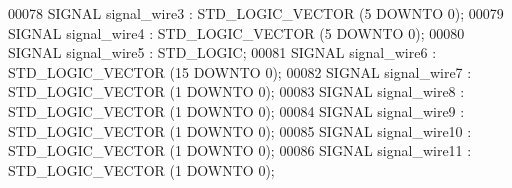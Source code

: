 \begin{DoxyCode}
{00078     \textcolor{keywordflow}{SIGNAL} \textcolor{vhdlchar}{signal_wire3} \textcolor{vhdlchar}{:}  \textcolor{comment}{STD\_LOGIC\_VECTOR} \textcolor{vhdlchar}{(}\textcolor{vhdllogic}{}\textcolor{vhdllogic}{5} \textcolor{keywordflow}{DOWNTO} \textcolor{vhdllogic}{}\textcolor{vhdllogic}{0}\textcolor{vhdlchar}{)};
00079     \textcolor{keywordflow}{SIGNAL} \textcolor{vhdlchar}{signal_wire4} \textcolor{vhdlchar}{:}  \textcolor{comment}{STD\_LOGIC\_VECTOR} \textcolor{vhdlchar}{(}\textcolor{vhdllogic}{}\textcolor{vhdllogic}{5} \textcolor{keywordflow}{DOWNTO} \textcolor{vhdllogic}{}\textcolor{vhdllogic}{0}\textcolor{vhdlchar}{)};
00080     \textcolor{keywordflow}{SIGNAL} \textcolor{vhdlchar}{signal_wire5} \textcolor{vhdlchar}{:}  \textcolor{comment}{STD\_LOGIC};
00081     \textcolor{keywordflow}{SIGNAL} \textcolor{vhdlchar}{signal_wire6} \textcolor{vhdlchar}{:}  \textcolor{comment}{STD\_LOGIC\_VECTOR} \textcolor{vhdlchar}{(}\textcolor{vhdllogic}{}\textcolor{vhdllogic}{15} \textcolor{keywordflow}{DOWNTO} \textcolor{vhdllogic}{}\textcolor{vhdllogic}{0}\textcolor{vhdlchar}{)};
00082     \textcolor{keywordflow}{SIGNAL} \textcolor{vhdlchar}{signal_wire7} \textcolor{vhdlchar}{:}  \textcolor{comment}{STD\_LOGIC\_VECTOR} \textcolor{vhdlchar}{(}\textcolor{vhdllogic}{}\textcolor{vhdllogic}{1} \textcolor{keywordflow}{DOWNTO} \textcolor{vhdllogic}{}\textcolor{vhdllogic}{0}\textcolor{vhdlchar}{)};
00083     \textcolor{keywordflow}{SIGNAL} \textcolor{vhdlchar}{signal_wire8} \textcolor{vhdlchar}{:}  \textcolor{comment}{STD\_LOGIC\_VECTOR} \textcolor{vhdlchar}{(}\textcolor{vhdllogic}{}\textcolor{vhdllogic}{1} \textcolor{keywordflow}{DOWNTO} \textcolor{vhdllogic}{}\textcolor{vhdllogic}{0}\textcolor{vhdlchar}{)};
00084     \textcolor{keywordflow}{SIGNAL} \textcolor{vhdlchar}{signal_wire9} \textcolor{vhdlchar}{:}  \textcolor{comment}{STD\_LOGIC\_VECTOR} \textcolor{vhdlchar}{(}\textcolor{vhdllogic}{}\textcolor{vhdllogic}{1} \textcolor{keywordflow}{DOWNTO} \textcolor{vhdllogic}{}\textcolor{vhdllogic}{0}\textcolor{vhdlchar}{)};
00085     \textcolor{keywordflow}{SIGNAL} \textcolor{vhdlchar}{signal_wire10}    \textcolor{vhdlchar}{:}  \textcolor{comment}{STD\_LOGIC\_VECTOR} \textcolor{vhdlchar}{(}\textcolor{vhdllogic}{}\textcolor{vhdllogic}{1} \textcolor{keywordflow}{DOWNTO} \textcolor{vhdllogic}{}\textcolor{vhdllogic}{0}\textcolor{vhdlchar}{)};
00086     \textcolor{keywordflow}{SIGNAL} \textcolor{vhdlchar}{signal_wire11}    \textcolor{vhdlchar}{:}  \textcolor{comment}{STD\_LOGIC\_VECTOR} \textcolor{vhdlchar}{(}\textcolor{vhdllogic}{}\textcolor{vhdllogic}{1} \textcolor{keywordflow}{DOWNTO} \textcolor{vhdllogic}{}\textcolor{vhdllogic}{0}\textcolor{vhdlchar}{)};
}
\end{DoxyCode}
